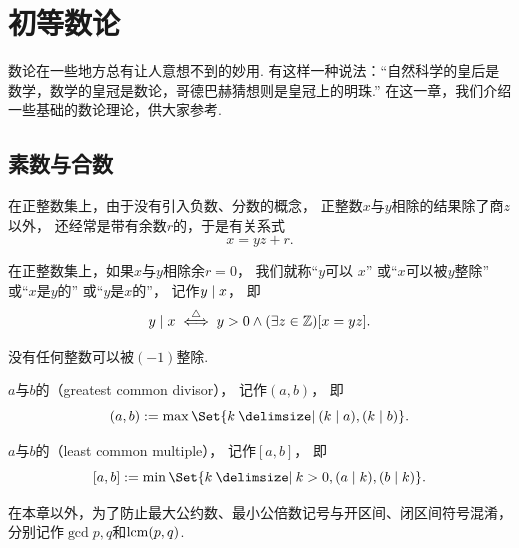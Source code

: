 \begingroup
\chapter{初等数论}
数论在一些地方总有让人意想不到的妙用.
有这样一种说法：“自然科学的皇后是数学，数学的皇冠是数论，哥德巴赫猜想则是皇冠上的明珠.”
在这一章，我们介绍一些基础的数论理论，供大家参考.

\section{素数与合数}
在正整数集上，由于没有引入负数、分数的概念，
正整数\(x\)与\(y\)相除的结果除了商\(z\)以外，
还经常是带有余数\(r\)的，于是有关系式\begin{equation*}
	x = y z + r.
\end{equation*}

\begin{definition}
在正整数集上，如果\(x\)与\(y\)相除余\(r=0\)，
我们就称“\(y\)可以 \(x\)”
或“\(x\)可以被\(y\)整除”
或“\(x\)是\(y\)的”
或“\(y\)是\(x\)的”，
记作\(\ExactlyDividedBy{x}{y}\)，
即\begin{equation*}
	\ExactlyDividedBy{x}{y}
	\defiff
	y > 0
	\land
	(\exists z\in\mathbb{Z})
	[x = y z].
\end{equation*}
\end{definition}

\begin{property}
没有任何整数可以被\((-1)\)整除.
\end{property}

\begin{definition}
\(a\)与\(b\)的（greatest common divisor），
记作\((a,b)\)，
即\begin{equation*}
	(a,b) \defeq \max\Set{ k \given (\ExactlyDividedBy{a}{k}), (\ExactlyDividedBy{b}{k}) }.
\end{equation*}
\end{definition}
\begin{definition}
\(a\)与\(b\)的（least common multiple），
记作\([a,b]\)，
即\begin{equation*}
	[a,b] \defeq \min\Set{ k \given k>0, (\ExactlyDividedBy{k}{a}), (\ExactlyDividedBy{k}{b}) }.
\end{equation*}
\end{definition}
在本章以外，为了防止最大公约数、最小公倍数记号与开区间、闭区间符号混淆，
分别记作\(\gcd{p,q}\)和\(\lcm{p,q}\).

